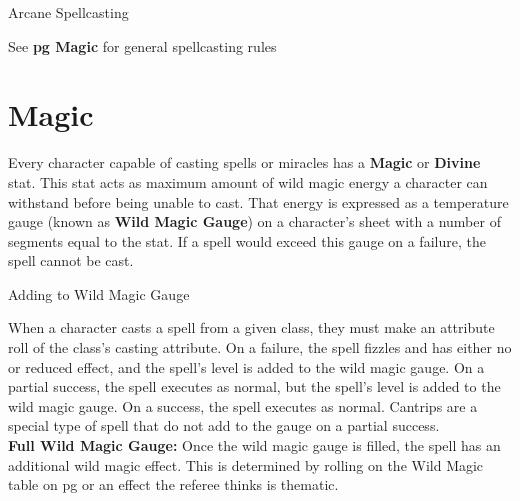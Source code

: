 \documentclass[18pt]{article}
\begin{document}
\begin{multicols}{2}
\begin{mercHeading}
Arcane Spellcasting
\end{mercHeading}
See  \textbf{pg \pageref{section:GenMagicRules} Magic} for general spellcasting rules

\section*{Magic}
\label{section:GenMagicRules}
Every character capable of casting spells or miracles has a \textbf{Magic} or \textbf{Divine} stat. This stat acts as maximum amount of wild magic energy a character can withstand before being unable to cast. That energy is expressed as a temperature gauge (known as \textbf{Wild Magic Gauge}) on a character's sheet with a number of segments equal to the stat. If a spell would exceed this gauge on a failure, the spell cannot be cast.
\begin{mercHeading}
{Adding to Wild Magic Gauge}
\end{mercHeading}
When a character casts a spell from a given class, they must make an attribute roll of the class's casting attribute. On a failure, the spell fizzles and has either no or reduced effect, and the spell's level is added to the wild magic gauge. On a partial success, the spell executes as normal, but the spell's level is added to the wild magic gauge. On a success, the spell executes as normal. Cantrips are a special type of spell that do not add to the gauge on a partial success.\\
\textbf{Full Wild Magic Gauge:}
Once the wild magic gauge is filled, the spell has an additional wild magic effect. This is determined by rolling on the Wild Magic table on pg \pageref{table:WildMagic} or an effect the referee thinks is thematic.
\end{multicols}
\end{document}
